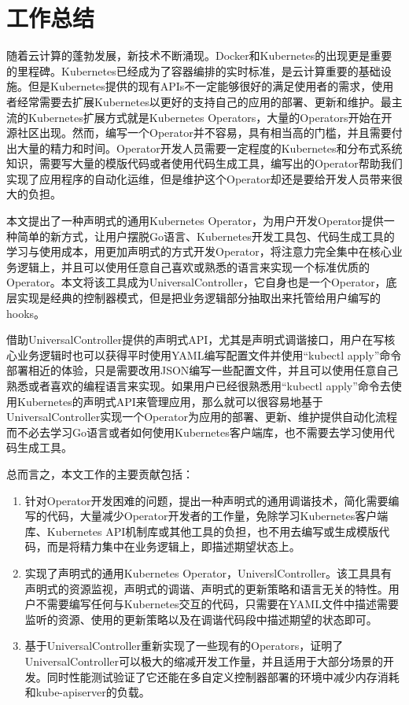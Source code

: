 \documentclass[macfonts,master]{njuthesis}
\begin{document}
\section{工作总结}
随着云计算的蓬勃发展，新技术不断涌现。Docker和Kubernetes的出现更是重要的里程碑。Kubernetes已经成为了容器编排的实时标准，是云计算重要的基础设施。但是Kubernetes提供的现有APIs不一定能够很好的满足使用者的需求，使用者经常需要去扩展Kubernetes以更好的支持自己的应用的部署、更新和维护。最主流的Kubernetes扩展方式就是Kubernetes Operators，大量的Operators开始在开源社区出现。然而，编写一个Operator并不容易，具有相当高的门槛，并且需要付出大量的精力和时间。Operator开发人员需要一定程度的Kubernetes和分布式系统知识，需要写大量的模版代码或者使用代码生成工具，编写出的Operator帮助我们实现了应用程序的自动化运维，但是维护这个Operator却还是要给开发人员带来很大的负担。

本文提出了一种声明式的通用Kubernetes Operator，为用户开发Operator提供一种简单的新方式，让用户摆脱Go语言、Kubernetes开发工具包、代码生成工具的学习与使用成本，用更加声明式的方式开发Operator，将注意力完全集中在核心业务逻辑上，并且可以使用任意自己喜欢或熟悉的语言来实现一个标准优质的Operator。本文将该工具成为UniversalController，它自身也是一个Operator，底层实现是经典的控制器模式，但是把业务逻辑部分抽取出来托管给用户编写的hooks。


借助UniversalController提供的声明式API，尤其是声明式调谐接口，用户在写核心业务逻辑时也可以获得平时使用YAML编写配置文件并使用``kubectl apply''命令部署相近的体验，只是需要改用JSON编写一些配置文件，并且可以使用任意自己熟悉或者喜欢的编程语言来实现。如果用户已经很熟悉用``kubectl apply''命令去使用Kubernetes的声明式API来管理应用，那么就可以很容易地基于UniversalController实现一个Operator为应用的部署、更新、维护提供自动化流程而不必去学习Go语言或者如何使用Kubernetes客户端库，也不需要去学习使用代码生成工具。

总而言之，本文工作的主要贡献包括：

\begin{enumerate}
	\item 针对Operator开发困难的问题，提出一种声明式的通用调谐技术，简化需要编写的代码，大量减少Operator开发者的工作量，免除学习Kubernetes客户端库、Kubernetes API机制库或其他工具的负担，也不用去编写或生成模版代码，而是将精力集中在业务逻辑上，即描述期望状态上。
	\item 实现了声明式的通用Kubernetes Operator，UniverslController。该工具具有声明式的资源监视，声明式的调谐、声明式的更新策略和语言无关的特性。用户不需要编写任何与Kubernetes交互的代码，只需要在YAML文件中描述需要监听的资源、使用的更新策略以及在调谐代码段中描述期望的状态即可。
	\item 基于UniversalController重新实现了一些现有的Operators，证明了UniversalController可以极大的缩减开发工作量，并且适用于大部分场景的开发。同时性能测试验证了它还能在多自定义控制器部署的环境中减少内存消耗和kube-apiserver的负载。
\end{enumerate}
\end{document}
